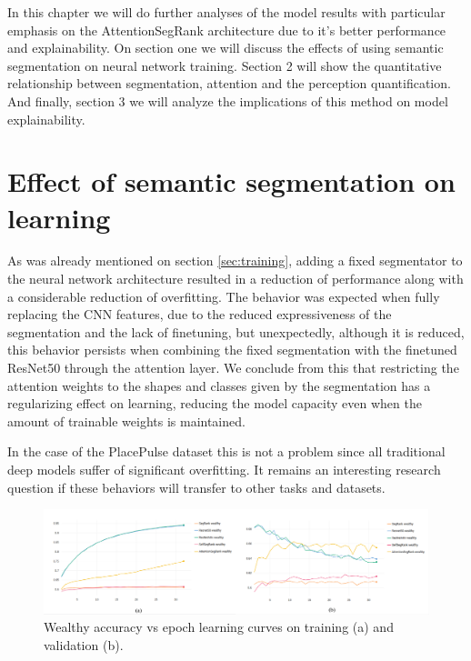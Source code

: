 In this chapter we will do further analyses of the model results with particular
emphasis on the AttentionSegRank architecture due to it's better performance
and explainability. On section one we will discuss the effects of using semantic segmentation
on neural network  training. Section 2 will show the quantitative relationship between
segmentation, attention and the perception quantification. And finally, section 3 we will
analyze the implications of this method on model explainability.

\section{Effect of semantic segmentation on learning}
As was already mentioned on section \ref{sec:training}, adding a fixed segmentator to
the neural network architecture resulted in a reduction of performance along with a considerable
reduction of overfitting. The behavior was expected when fully replacing the CNN features,
due to the reduced expressiveness of the segmentation and the lack of finetuning, but
unexpectedly, although it is reduced, this behavior persists when combining the fixed
segmentation with the finetuned ResNet50 through the attention layer. We conclude from this
that restricting the attention weights to the shapes and classes given by the segmentation
has a regularizing effect on learning, reducing the model capacity even when the amount of trainable
weights is maintained.

In the case of the PlacePulse dataset this is not a problem since
all traditional deep models suffer of significant overfitting. It remains an interesting research
question  if these behaviors will transfer to other tasks and datasets.

\begin{figure}[ht]
	\begin{center}
	\includegraphics[width=1\textwidth]{./figures/wealthy_graph.png}
	\caption[Wealthy Training curves]{
        Wealthy accuracy vs epoch learning curves on training (a) and validation (b).
        }
	\label{fig:wealthy_graph}
	\end{center}
\end{figure}

